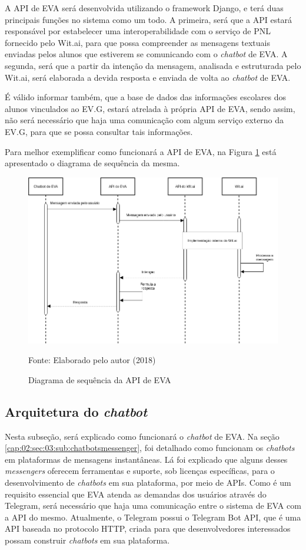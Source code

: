 A API de EVA será desenvolvida utilizando o framework Django, e terá duas principais funções no sistema como um todo. A primeira, será que a API estará responsável por estabelecer uma interoperabilidade com o serviço de PNL fornecido pelo Wit.ai, para que possa compreender as mensagens textuais enviadas pelos alunos que estiverem se comunicando com o \textit{chatbot} de EVA. A segunda, será que a partir da intenção da mensagem, analisada e estruturada pelo Wit.ai, será elaborada a devida resposta e enviada de volta ao \textit{chatbot} de EVA.

É válido informar também, que a base de dados das informações escolares dos alunos vinculados ao EV.G, estará atrelada à própria API de EVA, sendo assim, não será necessário que haja uma comunicação com algum serviço externo da EV.G, para que se possa consultar tais informações.

Para melhor exemplificar como funcionará a API de EVA, na Figura \ref{cap:03:fig:diagrama-sequencia-1} está apresentado o diagrama de sequência da mesma.
\begin{figure}
    \centering
    \includegraphics[width=0.7\linewidth]{src/imagens/EVAAPISEQUENCE.png}
    \caption{Diagrama de sequência da API de EVA} Fonte: Elaborado pelo autor (2018)
    \label{cap:03:fig:diagrama-sequencia-1}
\end{figure}

\subsection{Arquitetura do \textit{chatbot}}

Nesta subseção, será explicado como funcionará o \textit{chatbot} de EVA. Na seção \ref{cap:02:sec:03:sub:chatbotsmessenger}, foi detalhado como funcionam os \textit{chatbots} em plataformas de mensagens instantâneas. Lá foi explicado que alguns desses \textit{messengers} oferecem ferramentas e suporte, sob licenças específicas, para o desenvolvimento de \textit{chatbots} em sua plataforma, por meio de APIs. Como é um requisito essencial que EVA atenda as demandas dos usuários através do Telegram, será necessário que haja uma comunicação entre o sistema de EVA com a API do mesmo. Atualmente, o Telegram possui o Telegram Bot API, que é uma API baseada no protocolo HTTP, criada para que desenvolvedores interessados possam construir \textit{chatbots} em sua plataforma.

